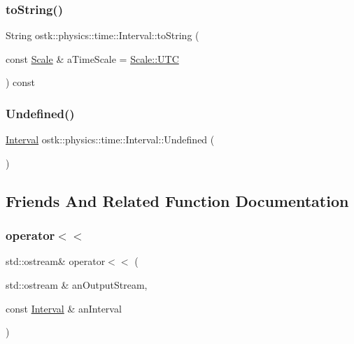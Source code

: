 \subsubsection{\texorpdfstring{to\+String()}{toString()}}
{\footnotesize\ttfamily String ostk\+::physics\+::time\+::\+Interval\+::to\+String (\begin{DoxyParamCaption}\item[{const \hyperlink{namespaceostk_1_1physics_1_1time_adf23d37bd8641fb76a0e98ab46a70df7}{Scale} \&}]{a\+Time\+Scale = {\ttfamily \hyperlink{namespaceostk_1_1physics_1_1time_adf23d37bd8641fb76a0e98ab46a70df7a9234324ddf6b4176b57d803a925b7961}{Scale\+::\+U\+TC}} }\end{DoxyParamCaption}) const}

\mbox{\label{classostk_1_1physics_1_1time_1_1_interval_a59ab818046b079fa047a739886d72747}} 
\subsubsection{\texorpdfstring{Undefined()}{Undefined()}}
{\footnotesize\ttfamily \hyperlink{classostk_1_1physics_1_1time_1_1_interval}{Interval} ostk\+::physics\+::time\+::\+Interval\+::\+Undefined (\begin{DoxyParamCaption}{ }\end{DoxyParamCaption})\hspace{0.3cm}{\ttfamily [static]}}



\subsection{Friends And Related Function Documentation}
\mbox{\label{classostk_1_1physics_1_1time_1_1_interval_a4671ce6746f99155561a1bdfade9749a}} 
\subsubsection{\texorpdfstring{operator$<$$<$}{operator<<}}
{\footnotesize\ttfamily std\+::ostream\& operator$<$$<$ (\begin{DoxyParamCaption}\item[{std\+::ostream \&}]{an\+Output\+Stream,  }\item[{const \hyperlink{classostk_1_1physics_1_1time_1_1_interval}{Interval} \&}]{an\+Interval }\end{DoxyParamCaption})\hspace{0.3cm}{\ttfamily [friend]}}



